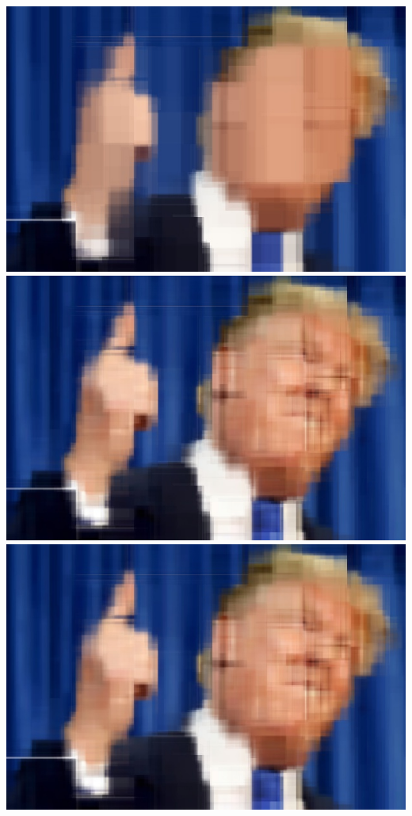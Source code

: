 \documentclass[12pt]{article}
\begin{document}
{\includegraphics[scale=0.2]{P1/RF_Trump_depth10trees20.jpg}
\includegraphics[scale=0.2]{P1/RF_Trump_depth20trees40.jpg}
\includegraphics[scale=0.2]{P1/RF_Trump_depth40trees80.jpg}

}
\end{document}
